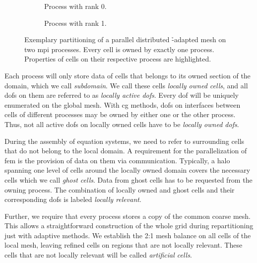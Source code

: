 \begin{figure}
\begin{subfigure}[t]{.35\textwidth}
  \centering
  
  \caption{Process with rank 0.}
\end{subfigure}
\begin{subfigure}[t]{.35\textwidth}
  \centering
  
  \caption{Process with rank 1.}
\end{subfigure}
\begin{minipage}[t]{.28\textwidth}
  \centering
  
\end{minipage}
\caption[Partitioning of a parallel distributed \h-adapted mesh.]{Exemplary partitioning of a parallel distributed \h-adapted mesh on two \gls{mpi} processes. Every cell is owned by exactly one process. Properties of cells on their respective process are highlighted.}
\label{fig:paralleldistribution}
\end{figure}

Each process will only store data of cells that belongs to its owned section of the domain, which we call \textit{subdomain}. We call these cells \textit{locally owned cells}, and all \glspl{dof} on them are referred to as \textit{locally active \glspl{dof}}. Every \gls{dof} will be uniquely enumerated on the global mesh. With \gls{cg} methods, \glspl{dof} on interfaces between cells of different processes may be owned by either one or the other process. Thus, not all active \glspl{dof} on locally owned cells have to be \textit{locally owned \glspl{dof}}.

During the assembly of equation systems, we need to refer to surrounding cells that do not belong to the local domain. A requirement for the parallelization of \gls{fem} is the provision of data on them via communication. Typically, a halo spanning one level of cells around the locally owned domain covers the necessary cells which we call \textit{ghost cells}. Data from ghost cells has to be requested from the owning process. The combination of locally owned and ghost cells and their corresponding \glspl{dof} is labeled \textit{locally relevant}.

Further, we require that every process stores a copy of the common coarse mesh. This allows a straightforward construction of the whole grid during repartitioning just with adaptive methods. We establish the 2:1 mesh balance on all cells of the local mesh, leaving refined cells on regions that are not locally relevant. These cells that are not locally relevant will be called \textit{artificial cells}.

